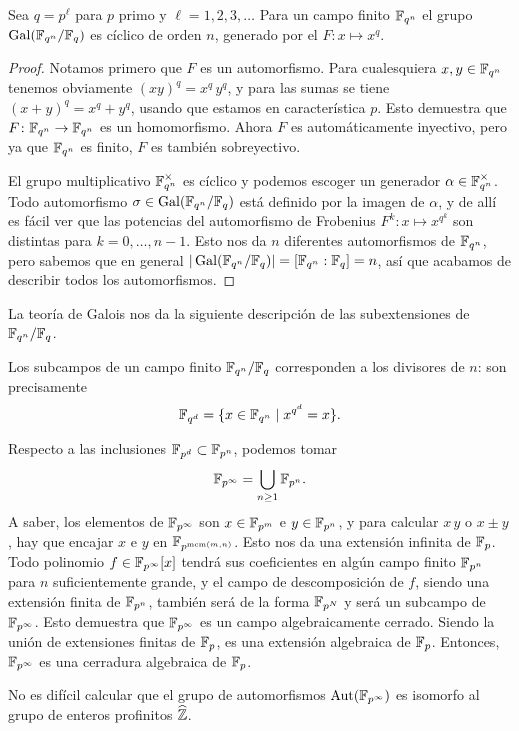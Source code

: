 \begin{teorema}
  \label{thm:grupo-de-Galois-de-campo-finito}
  Sea $q = p^\ell$ para $p$ primo y $\ell = 1,2,3,\ldots$ Para un campo finito
  $\mathbb{F}_{q^n}$ el grupo $\operatorname{Gal} (\mathbb{F}_{q^n}/\mathbb{F}_q)$ es cíclico de orden $n$,
  generado por el  $F\colon x \mapsto x^q$.

  \begin{proof}
    Notamos primero que $F$ es un automorfismo. Para cualesquiera
    $x,y\in \mathbb{F}_{q^n}$ tenemos obviamente $(xy)^q = x^q\,y^q$, y para las sumas
    se tiene $(x + y)^q = x^q + y^q$, usando que estamos en característica $p$.
    Esto demuestra que $F\colon \mathbb{F}_{q^n} \to \mathbb{F}_{q^n}$ es un homomorfismo.
    Ahora $F$ es automáticamente inyectivo, pero ya que $\mathbb{F}_{q^n}$ es finito,
    $F$ es también sobreyectivo.

    El grupo multiplicativo $\mathbb{F}_{q^n}^\times$ es cíclico y podemos escoger un
    generador $\alpha \in \mathbb{F}_{q^n}^\times$. Todo automorfismo
    $\sigma \in \operatorname{Gal} (\mathbb{F}_{q^n}/\mathbb{F}_q)$ está definido por la imagen de $\alpha$,
    y de allí es fácil ver que las potencias del automorfismo de Frobenius
    $F^k\colon x\mapsto x^{q^k}$ son distintas para $k = 0, \ldots, n-1$.
    Esto nos da $n$ diferentes automorfismos de $\mathbb{F}_{q^n}$, pero sabemos que
    en general $|\operatorname{Gal} (\mathbb{F}_{q^n}/\mathbb{F}_q)| = [\mathbb{F}_{q^n} : \mathbb{F}_q] = n$, así que
    acabamos de describir todos los automorfismos.
  \end{proof}
\end{teorema}

La teoría de Galois nos da la siguiente descripción de las subextensiones
de $\mathbb{F}_{q^n}/\mathbb{F}_q$.

\begin{corolario}
  Los subcampos de un campo finito $\mathbb{F}_{q^n}/\mathbb{F}_q$ corresponden a los
  divisores de $n$: son precisamente
  $$\mathbb{F}_{q^d} = \{ x\in \mathbb{F}_{q^n} \mid x^{q^d} = x \}.$$
\end{corolario}

\begin{comentario}
  Respecto a las inclusiones $\mathbb{F}_{p^d} \subset \mathbb{F}_{p^n}$, podemos tomar
  $$\mathbb{F}_{p^\infty} = \bigcup_{n\ge 1} \mathbb{F}_{p^n}.$$
  A saber, los elementos de $\mathbb{F}_{p^\infty}$ son $x\in \mathbb{F}_{p^m}$ e
  $y \in \mathbb{F}_{p^n}$, y para calcular $x\,y$ o $x\pm y$, hay que encajar $x$ e $y$
  en $\mathbb{F}_{p^{\operatorname{mcm} (m,n)}}$. Esto nos da una extensión infinita de $\mathbb{F}_p$.
  Todo polinomio $f \in \mathbb{F}_{p^\infty} [x]$ tendrá sus coeficientes en algún campo
  finito $\mathbb{F}_{p^n}$ para $n$ suficientemente grande, y el campo de descomposición
  de $f$, siendo una extensión finita de $\mathbb{F}_{p^n}$, también será de la forma
  $\mathbb{F}_{p^N}$ y será un subcampo de $\mathbb{F}_{p^\infty}$. Esto demuestra que
  $\mathbb{F}_{p^\infty}$ es un campo algebraicamente cerrado. Siendo la unión de
  extensiones finitas de $\mathbb{F}_p$, es una extensión algebraica de
  $\mathbb{F}_p$. Entonces, $\mathbb{F}_{p^\infty}$ es una cerradura algebraica de $\mathbb{F}_p$.

  No es difícil calcular que el grupo de automorfismos $\operatorname{Aut} (\mathbb{F}_{p^\infty})$
  es isomorfo al grupo de enteros profinitos $\widehat{\mathbb{Z}}$.
\end{comentario}


